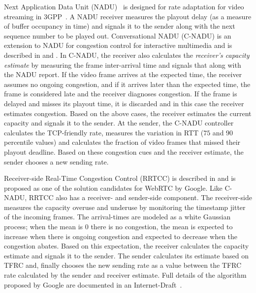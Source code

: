 Next Application Data Unit (NADU)~\cite{nadu.1070341,nadu.1530486} is designed
for rate adaptation for video streaming in 3GPP~\cite{3gpp.26.234}. A NADU
receiver measures the playout delay (as a measure of buffer occupancy in time)
and signals it to the sender along with the next sequence number to be played
out. Conversational NADU (C-NADU) is an extension to NADU for congestion
control for interactive multimedia and is described in  and
. In C-NADU, the receiver also calculates the
\emph{receiver's capacity estimate} by measuring the frame inter-arrival time
and signals that along with the NADU report. If the video frame arrives at the
expected time, the receiver assumes no ongoing congestion, and if it arrives
later than the expected time, the frame is considered late and the receiver
diagnoses congestion. If the frame is delayed and misses its playout time, it
is discarded and in this case the receiver estimates congestion. Based on the
above cases, the receiver estimates the current capacity and signals it to the
sender. At the sender, the C-NADU controller calculates the TCP-friendly rate,
measures the variation in RTT ($75$ and $90$ percentile values) and calculates
the fraction of video frames that missed their playout deadline. Based on
these congestion cues and the receiver estimate, the sender chooses a new
sending rate.


Receiver-side Real-Time Congestion Control (RRTCC) is described in
\cite{draft.rrtcc} and is proposed as one of the solution candidates for
WebRTC by Google. Like C-NADU, RRTCC also has a receiver- and sender-side
component. The receiver-side measures the capacity overuse and underuse by
monitoring the timestamp jitter of the incoming frames. The arrival-times are
modeled as a white Gaussian process; when the mean is 0 there is no
congestion, the mean is expected to increase when there is ongoing congestion
and expected to decrease when the congestion abates. Based on this
expectation, the receiver calculates the capacity estimate and signals it to
the sender. The sender calculates its estimate based on TFRC and, finally
chooses the new sending rate as a value between the TFRC rate calculated by
the sender and receiver estimate. Full details of the algorithm proposed by
Google are documented in an Internet-Draft~\cite{draft.rrtcc}.



